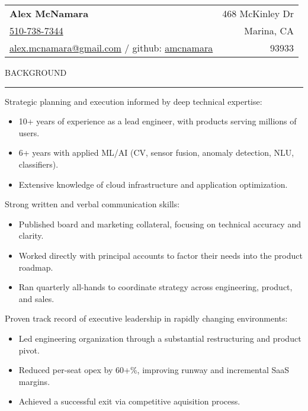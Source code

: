 \documentclass[12pt]{article}
\makeatletter
\newenvironment{justifycolumns}
{\begin{tabular*}{\textwidth}{@{\extracolsep{\fill}} lr@{}}}
{\end{tabular*}}
\newcommand{\row}[2]{#1 & #2 \\}
\newcommand{\blockseparation}{\vspace{0.13in}}
\newcommand{\heading}[1]{
	\vspace{0.05in}
	\uppercase{#1}
	\vspace{0.05in}
	\hrule
	\blockseparation
}
\newcommand{\bulletheading}[1]{
	\vspace{0.075in}
	\hspace{0.1in}
	{#1}
	\vspace{0.03in}
}
\newenvironment{tightbullets}
{\begin{itemize}}
{\end{itemize}}
\makeatother
\begin{document}
\begin{flushleft}

\begin{justifycolumns}
	\row{\large\textbf{Alex McNamara}}{468 McKinley Dr}
	\row{\href{tel:15107387344}{510-738-7344}}{Marina, CA}
	\row{
		\href{mailto:alex.mcnamara@gmail.com}{alex.mcnamara@gmail.com} / github: 
		\href{http://www.github.com/amcnamara}{amcnamara}
	}{93933}
\end{justifycolumns}
\vspace{0.175in}


\heading{Background}
\bulletheading{Strategic planning and execution informed by deep technical expertise:}
\begin{tightbullets}
	\item 10+ years of experience as a lead engineer, with products serving millions of users.
	\item 6+ years with applied ML/AI (CV, sensor fusion, anomaly detection, NLU, classifiers).
	\item Extensive knowledge of cloud infrastructure and application optimization.
\end{tightbullets}

\bulletheading{Strong written and verbal communication skills:}
\begin{tightbullets}
	\item Published board and marketing collateral, focusing on technical accuracy and clarity.
	\item Worked directly with principal accounts to factor their needs into the product roadmap.
	\item Ran quarterly all-hands to coordinate strategy across engineering, product, and sales.
\end{tightbullets}

\bulletheading{Proven track record of executive leadership in rapidly changing environments:}
\begin{tightbullets}
	\item Led engineering organization through a substantial restructuring and product pivot.
	\item Reduced per-seat opex by 60+\%, improving runway and incremental SaaS margins.
	\item Achieved a successful exit via competitive aquisition process.
\end{tightbullets}


\blockseparation



\end{flushleft}
\end{document}
